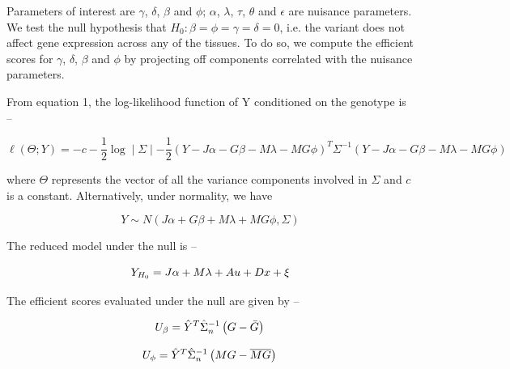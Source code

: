 \documentclass[hidelinks]{article}
\begin{document}
Parameters of interest are $\gamma$, $\delta$, $\beta$ and $\phi$; $\alpha$, $\lambda$, $\tau$, $\theta$ and $\epsilon$ are nuisance parameters. We test the null hypothesis that $H_0: \beta = \phi = \gamma =  \delta = 0$, i.e. the variant does not affect gene expression across any of the tissues. To do so, we compute the efficient scores for $\gamma$, $\delta$, $\beta$ and $\phi$ by projecting off components correlated with the nuisance parameters. 


%
%

From equation 1, the log-likelihood function of Y conditioned on the genotype is --

\begin{equation}
\ell \left( \Theta ;Y \right) =  - c - \frac{1}{2} \log \mid \Sigma \mid - \frac{1}{2} \left( Y  - J \alpha - G\beta - M\lambda - MG\phi \right )^T \Sigma ^{-1} \left( Y  - J \alpha - G\beta - M\lambda - MG\phi \right )
\end{equation}

where $\Theta$ represents the vector of all the variance components involved in $\Sigma$ and $c$ is a constant. Alternatively, under normality, we have

\[
Y \sim N( J\alpha + G\beta + M\lambda + MG\phi,\Sigma )
\]

The reduced model under the null is --

\begin{equation*}
\large
Y_{H_0} = J\alpha +  M\lambda + Au + Dx + \xi
\end{equation*}

The efficient scores evaluated under the null are given by --

\begingroup
\large
\begin{equation*}
U_\beta = \hat{Y}^T \hat{\Sigma}_n^{-1} \left( G - \bar{G} \right) \\
\end{equation*}
\endgroup

\begingroup
\large
\begin{equation*}
U_\phi = \hat{Y}^T \hat{\Sigma}_n^{-1} \left( MG - \overline{MG} \right) \\
\end{equation*}
\endgroup
\end{document}
